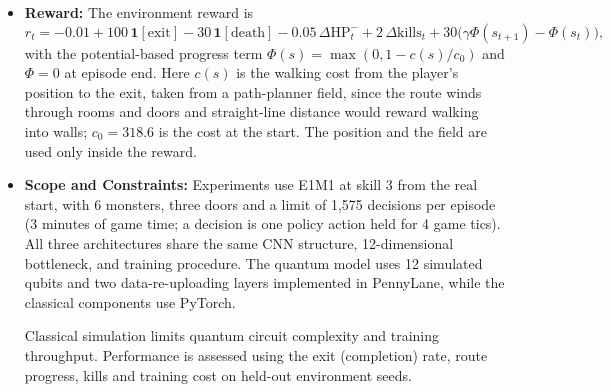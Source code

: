 \documentclass[10pt, a4paper]{article}
\begin{document}
\begin{itemize}
    \textbf{Imitation objective.} PPO from scratch did not learn E1M1 (Section~\ref{sec:ppo_attempts}),
    so the policies that clear the level are trained by DAgger imitation \cite{ross_dagger_2011} of a scripted teacher
    $\pi_T$ that reads private game state. With teacher action $a^\star_t=\pi_T(s_t)$ on the states $o_t$ visited by
    the current student, the loss is
    \begin{equation}
        \mathcal{L}_{\mathrm{BC}}=-\mathbb{E}_{o_t\sim\mathcal{D}}\!\left[w_{a^\star_t}\log\pi(a^\star_t|\mathbf{z}_t)\right]
        +c_a\mathcal{L}_{\mathrm{aux}},\qquad w_a\propto f_a^{-0.75},
    \end{equation}
    where $f_a$ is the frequency of action $a$ in the aggregated dataset $\mathcal{D}$, so that rare actions such
    as USE are not ignored. After each round the student drives, the teacher labels the visited states,
    and they are added to $\mathcal{D}$.

    \item \textbf{Reward:}
    The environment reward is
    \begin{equation}
        r_t=-0.01+100\,\mathbf{1}[\text{exit}]-30\,\mathbf{1}[\text{death}]-0.05\,\Delta\mathrm{HP}^{-}_t+2\,\Delta\mathrm{kills}_t
        +30\big(\gamma\Phi(s_{t+1})-\Phi(s_t)\big),
    \end{equation}
    with the potential-based progress term $\Phi(s)=\max(0,1-c(s)/c_0)$ and $\Phi=0$ at episode end.
    Here $c(s)$ is the walking cost from the player's position to the exit, taken from a path-planner field, since the
    route winds through rooms and doors and straight-line distance would reward walking into walls; $c_0=318.6$ is the cost at the start.
    The position and the field are used only inside the reward.

    \item \textbf{Scope and Constraints:}
    Experiments use E1M1 at skill 3 from the real start, with 6 monsters, three doors and a limit of 1,575 decisions per episode (3 minutes of game time; a decision is one policy action held for 4 game tics).
    All three architectures share the same CNN
    structure, 12-dimensional bottleneck, and training
    procedure. The quantum model uses
    12 simulated qubits and two data-re-uploading
    layers implemented in PennyLane, while the
    classical components use PyTorch.

    Classical simulation limits quantum circuit
    complexity and training throughput. Performance
    is assessed using the exit (completion) rate, route
    progress, kills and training cost on held-out
    environment seeds.
\end{itemize}
\end{document}
